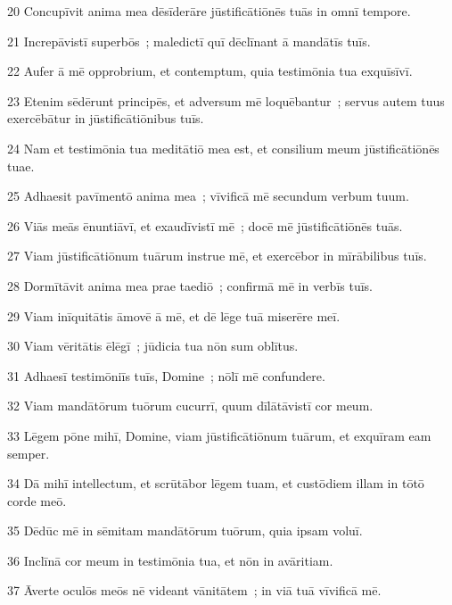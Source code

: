 \psalmVerse
  {\phantom{0}20}
  {Concupīvit anima mea dēsīderāre jūstificātiōnēs tuās in omnī tempore.}


\psalmVerse
  {\phantom{0}21}
  {Increpāvistī superbōs~; maledictī quī dēclīnant ā mandātīs tuīs.}


\psalmVerse
  {\phantom{0}22}
  {Aufer ā mē opprobrium, et contemptum, quia testimōnia tua exquīsīvī.}


\psalmVerse
  {\phantom{0}23}
  {Etenim sēdērunt principēs, et adversum mē loquēbantur~; servus autem tuus exercēbātur in jūstificātiōnibus tuīs.}


\psalmVerse
  {\phantom{0}24}
  {Nam et testimōnia tua meditātiō mea est, et consilium meum jūstificātiōnēs tuae.}


\psalmVerse
  {\phantom{0}25}
  {Adhaesit pavīmentō anima mea~; vīvificā mē secundum verbum tuum.}


\psalmVerse
  {\phantom{0}26}
  {Viās meās ēnuntiāvī, et exaudīvistī mē~; docē mē jūstificātiōnēs tuās.}


\psalmVerse
  {\phantom{0}27}
  {Viam jūstificātiōnum tuārum instrue mē, et exercēbor in mīrābilibus tuīs.}


\psalmVerse
  {\phantom{0}28}
  {Dormītāvit anima mea prae taediō~; confirmā mē in verbīs tuīs.}


\psalmVerse
  {\phantom{0}29}
  {Viam inīquitātis āmovē ā mē, et dē lēge tuā miserēre meī.}


\psalmVerse
  {\phantom{0}30}
  {Viam vēritātis ēlēgī~; jūdicia tua nōn sum oblītus.}


\psalmVerse
  {\phantom{0}31}
  {Adhaesī testimōniīs tuīs, Domine~; nōlī mē confundere.}


\psalmVerse
  {\phantom{0}32}
  {Viam mandātōrum tuōrum cucurrī, quum dīlātāvistī cor meum.}


\psalmVerse
  {\phantom{0}33}
  {Lēgem pōne mihī, Domine, viam jūstificātiōnum tuārum, et exquīram eam semper.}


\psalmVerse
  {\phantom{0}34}
  {Dā mihī intellectum, et scrūtābor lēgem tuam, et custōdiem illam in tōtō corde meō.}


\psalmVerse
  {\phantom{0}35}
  {Dēdūc mē in sēmitam mandātōrum tuōrum, quia ipsam voluī.}


\psalmVerse
  {\phantom{0}36}
  {Inclīnā cor meum in testimōnia tua, et nōn in avāritiam.}


\psalmVerse
  {\phantom{0}37}
  {Āverte oculōs meōs nē videant vānitātem~; in viā tuā vīvificā mē.}


